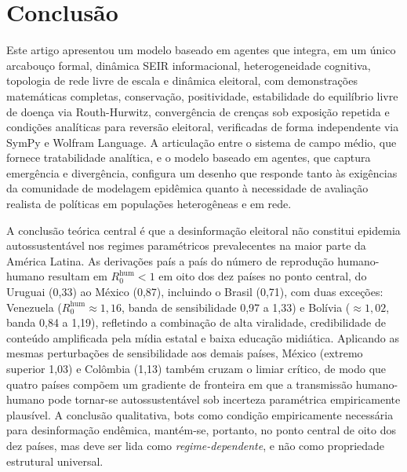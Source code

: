 \documentclass[12pt,a4paper]{article}
\theoremstyle{definition}
\theoremstyle{plain}
\begin{document}
\section{Conclusão}
\label{sec:conclusion}

Este artigo apresentou um modelo baseado em agentes que integra, em um único arcabouço formal, dinâmica SEIR informacional, heterogeneidade cognitiva, topologia de rede livre de escala e dinâmica eleitoral, com demonstrações matemáticas completas, conservação, positividade, estabilidade do equilíbrio livre de doença via Routh-Hurwitz, convergência de crenças sob exposição repetida e condições analíticas para reversão eleitoral, verificadas de forma independente via SymPy e Wolfram Language. A articulação entre o sistema de campo médio, que fornece tratabilidade analítica, e o modelo baseado em agentes, que captura emergência e divergência, configura um desenho que responde tanto às exigências da comunidade de modelagem epidêmica quanto à necessidade de avaliação realista de políticas em populações heterogêneas e em rede.

A conclusão teórica central é que a desinformação eleitoral não constitui epidemia autossustentável nos regimes paramétricos prevalecentes na maior parte da América Latina. As derivações país a país do número de reprodução humano-humano resultam em $R_0^{\text{hum}} < 1$ em oito dos dez países no ponto central, do Uruguai (0,33) ao México (0,87), incluindo o Brasil (0,71), com duas exceções: Venezuela ($R_0^{\text{hum}} \approx 1{,}16$, banda de sensibilidade 0,97 a 1,33) e Bolívia ($\approx 1{,}02$, banda 0,84 a 1,19), refletindo a combinação de alta viralidade, credibilidade de conteúdo amplificada pela mídia estatal e baixa educação midiática. Aplicando as mesmas perturbações de sensibilidade aos demais países, México (extremo superior 1,03) e Colômbia (1,13) também cruzam o limiar crítico, de modo que quatro países compõem um gradiente de fronteira em que a transmissão humano-humano pode tornar-se autossustentável sob incerteza paramétrica empiricamente plausível. A conclusão qualitativa, bots como condição empiricamente necessária para desinformação endêmica, mantém-se, portanto, no ponto central de oito dos dez países, mas deve ser lida como \emph{regime-dependente}, e não como propriedade estrutural universal.
\end{document}
